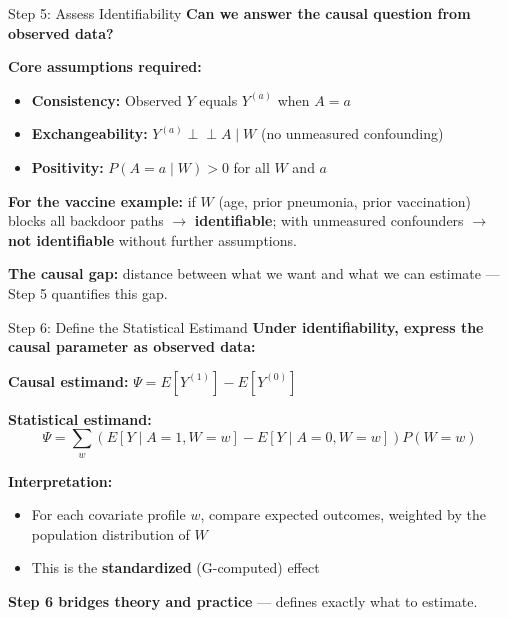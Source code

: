 \documentclass[aspectratio=169]{beamer}
\begin{document}
\begin{frame}{Step 5: Assess Identifiability}
  \small
  \textbf{Can we answer the causal question from observed data?}
  \vspace{0.2em}

  \textbf{Core assumptions required:}
  \begin{itemize}
    \item \textbf{Consistency:} Observed $Y$ equals $Y^{(a)}$ when $A=a$
    \item \textbf{Exchangeability:} $Y^{(a)} \perp\!\!\!\perp A \mid W$ (no unmeasured confounding)
    \item \textbf{Positivity:} $P(A=a \mid W) > 0$ for all $W$ and $a$
  \end{itemize}
  \vspace{0.2em}

  \textbf{For the vaccine example:} if $W$ (age, prior pneumonia, prior vaccination) blocks all
  backdoor paths $\rightarrow$ \textbf{identifiable}; with unmeasured
  confounders $\rightarrow$ \textbf{not identifiable} without further
  assumptions.
  \vspace{0.2em}

  \textcolor{accent}{\textbf{The causal gap:}} distance between what we
  want and what we can estimate --- Step 5 quantifies this gap.
\end{frame}

\begin{frame}{Step 6: Define the Statistical Estimand}
  \small
  \setlength{\abovedisplayskip}{4pt}\setlength{\belowdisplayskip}{4pt}
  \textbf{Under identifiability, express the causal parameter as observed data:}

  \textbf{Causal estimand:} $\Psi = E[Y^{(1)}] - E[Y^{(0)}]$

  \textbf{Statistical estimand:}
  \[
    \Psi = \sum_{w} \left( E[Y \mid A=1, W=w] - E[Y \mid A=0, W=w] \right) P(W=w)
  \]

  \textbf{Interpretation:}
  \begin{itemize}
    \item For each covariate profile $w$, compare expected outcomes,
      weighted by the population distribution of $W$
    \item This is the \textbf{standardized} (G-computed) effect
  \end{itemize}
  \vspace{0.2em}

  \textcolor{accent}{\textbf{Step 6 bridges theory and practice}} --- defines exactly what to estimate.
\end{frame}
\end{document}
